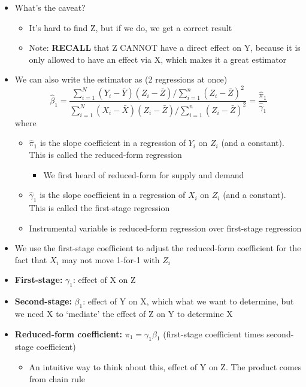 \documentclass[10pt, oneside]{article}
\begin{document}
\begin{itemize}
\begin{itemize}
\begin{itemize}
        \end{itemize}
        \item What's the caveat?
        \begin{itemize}
            \item It's hard to find Z, but if we do, we get a correct result
            \item Note: \textbf{RECALL} that Z CANNOT have a direct effect on Y, because it is only allowed to have an effect via X, which makes it a great estimator
        \end{itemize}
        \item We can also write the estimator as (2 regressions at once)
        \[ \hat \beta_1 = \frac{\sum_{i=1}^N (Y_i - \bar Y) (Z_i - \bar Z) / \sum_{i=1}^n (Z_i - \bar Z)^2}{\sum_{i=1}^N (X_i - \bar X) (Z_i - \bar Z) / \sum_{i=1}^n (Z_i - \bar Z)^2} = \frac{\hat \pi_1}{\hat \gamma_1}\]
        where
        \begin{itemize}
            \item $\hat \pi_1$ is the slope coefficient in a regression of $Y_i$ on $Z_i$ (and a constant). This is called the reduced-form regression
            \begin{itemize}
                \item We first heard of reduced-form for supply and demand
            \end{itemize}
            \item $\hat \gamma_1$ is the slope coefficient in a regression of $X_i$ on $Z_i$ (and a constant). This is called the first-stage regression
            \item Instrumental variable is reduced-form regression over first-stage regression
        \end{itemize}
        \item We use the first-stage coefficient to adjust the reduced-form coefficient for the fact that $X_i$ may not move 1-for-1 with $Z_i$
        \item \textbf{First-stage:} $\gamma_1$: effect of X on Z
        \item \textbf{Second-stage:} $\beta_1$: effect of Y on X, which what we want to determine, but we need X to `mediate' the effect of Z on Y to determine X
        \item \textbf{Reduced-form coefficient:} $\pi_1 = \gamma_1 \beta_1$ (first-stage coefficient times second-stage coefficient)
        \begin{itemize}
            \item An intuitive way to think about this, effect of Y on Z. The product comes from chain rule

\end{itemize}
\end{itemize}
\end{itemize}
\end{document}
